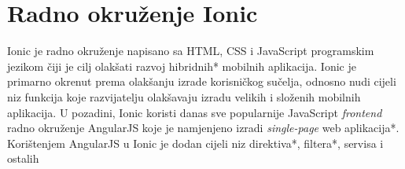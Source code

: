 \begin{center}
\begin{description}
    \end{description}
\end{center}

\section*{Radno okruženje Ionic}
Ionic je radno okruženje napisano sa HTML, CSS i JavaScript programskim jezikom čiji je cilj olakšati razvoj hibridnih* mobilnih aplikacija. Ionic je primarno okrenut prema olakšanju izrade korisničkog sučelja, odnosno nudi cijeli niz funkcija koje razvijatelju olakšavaju izradu velikih i složenih mobilnih aplikacija. U pozadini, Ionic koristi danas sve popularnije JavaScript \textit{frontend} radno okruženje AngularJS koje je namjenjeno izradi \textit{single-page} web aplikacija*. Korištenjem AngularJS u Ionic je dodan cijeli niz direktiva*, filtera*, servisa i ostalih 